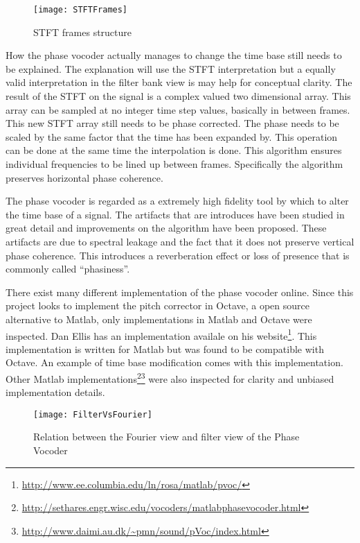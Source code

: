 \begin{wrapfigure}{L}{0.5\textwidth}
	\texttt{[image: STFTFrames]}
	\caption{STFT frames structure\protect\footnotemark}
	\label{fig:STFTFrames}
\end{wrapfigure}


How the phase vocoder actually manages to change the time base still needs to be
explained. The explanation will use the STFT interpretation but a equally valid
interpretation in the filter bank view is may help for conceptual clarity. The
result of the STFT on the signal is a complex valued two dimensional array. This
array can be sampled at no integer time step values, basically in between frames.
This new STFT array still needs to be phase corrected. The phase needs to be
scaled by the same factor that the time has been expanded by\cite{DolsonTutorial}.
This operation can be done at the same time the interpolation is done. This
algorithm ensures individual frequencies to be lined up between frames.
Specifically the algorithm preserves horizontal phase coherence.

The phase vocoder is regarded as a extremely high fidelity tool by which to alter
the time base of a signal. The artifacts that are introduces have been studied in
great detail and improvements on the algorithm have been
proposed\cite{ImprovedPhaseVocoder}. These artifacts are due to spectral leakage
and the fact that it does not preserve vertical phase coherence. This introduces a
reverberation effect or loss of presence that is commonly called
``phasiness''\cite{ImprovedPhaseVocoder}.

There exist many different implementation of the phase vocoder online. Since this
project looks to implement the pitch corrector in Octave, a open source
alternative to Matlab, only implementations in Matlab and Octave were inspected.
Dan Ellis has an implementation availale on his
website\footnote{\url{http://www.ee.columbia.edu/ln/rosa/matlab/pvoc/}}. This
implementation is written for Matlab but was found to be compatible with Octave.
An example of time base modification comes with this implementation.
Other Matlab implementations\footnote{\url{http://sethares.engr.wisc.edu/vocoders/matlabphasevocoder.html}}\footnote{\url{http://www.daimi.au.dk/~pmn/sound/pVoc/index.html}}
were also inspected for clarity and unbiased implementation details.

\vfill
\begin{figure}[h]
\centering
	\texttt{[image: FilterVsFourier]}
	\caption{Relation between the Fourier view and filter view of the Phase
	Vocoder\cite{DolsonTutorial}}
	\label{fig:FilterVsFourier}
\end{figure}
